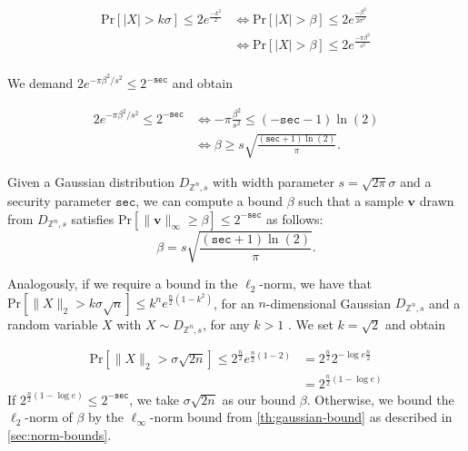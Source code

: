\begin{align}
    \text{Pr}\left[ |X| > k\sigma \right] \leq 2 e^{\frac{-k^2}{2}} & \iff \text{Pr}\left[ |X| > \beta \right] \leq 2 e^{\frac{-\beta^2}{2\sigma^2}} \\
                                                                    & \iff \text{Pr}\left[ |X| > \beta \right] \leq 2 e^{\frac{-\pi \beta^2}{s^2}}   \\
\end{align}

We demand $2 e^{-\pi \beta^2/s^2} \leq 2^{-\texttt{sec}}$  and obtain

\begin{align*}
    2 e^{-\pi \beta^2/s^2}   \leq 2^{-\texttt{sec}} & \iff       -\pi \frac{\beta^2}{s^2} \leq (-\texttt{sec} - 1)\ln (2)                \\
                                                    & \iff \beta                    \geq s \sqrt{\frac{(\texttt{sec} + 1) \ln(2)}{\pi}}.
\end{align*}

\begin{theorem}\label{th:gaussian-bound}
    Given a Gaussian distribution $D_{\mathbb{Z}^n, s}$ with width parameter $s  = \sqrt{2 \pi} \sigma$ and a security parameter $\texttt{sec}$, we can compute a bound $\beta$ such that a sample $\mathbf{v}$ drawn from $D_{\mathbb{Z}^n, s}$ satisfies $\text{Pr}\left[ \|\mathbf{v}\|_\infty \geq \beta \right] \leq 2^{-\texttt{sec}}$ as follows:
    \begin{equation}
        \beta  = s \sqrt{\frac{(\texttt{sec} + 1) \ln(2)}{\pi}}.
    \end{equation}
\end{theorem}

Analogously, if we require a bound in the $\ell_2$-norm, we have that $\text{Pr}\left[ \|X\|_2 > k\sigma \sqrt{n} \right] \leq k^n e^{\frac{n}{2}(1-k^2)}$, for an $n$-dimensional Gaussian $D_{\mathbb{Z}^n, s}$ and a random variable $X$ with $X \sim D_{\mathbb{Z}^n, s}$, for any $k>1$ \cite[Lemma~4.4]{Lyu12}. We set $k=\sqrt{2}$ and obtain

\begin{align*}
    \text{Pr}\left[ \|X\|_2 > \sigma \sqrt{2n} \right] \leq 2^{\frac{n}{2}} e^{\frac{n}{2}(1-2)} & = 2^{\frac{n}{2}} 2^{-\log e \frac{n}{2}} \\
                                                                                                 & = 2^{\frac{n}{2}(1 -\log e)}
\end{align*}
If $2^{\frac{n}{2}(1 -\log e)} \leq 2^{-\texttt{sec}}$, we take $\sigma \sqrt{2n}$ as our bound $\beta$. Otherwise, we bound the $\ell_2$-norm of $\beta$ by the $\ell_\infty$-norm bound from \cref{th:gaussian-bound} as described in \cref{sec:norm-bounds}.

